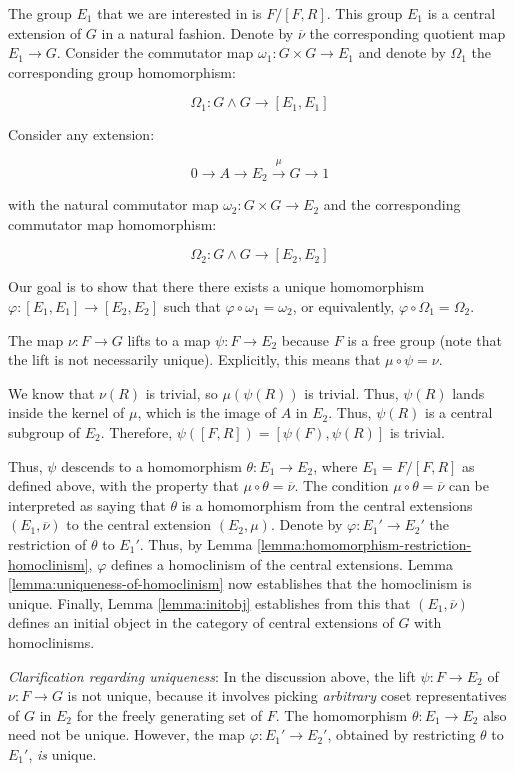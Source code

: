 \documentclass{ucetd}
\begin{document}
The group $E_1$ that we are interested in is $F/[F,R]$. This group
$E_1$ is a central extension of $G$ in a natural fashion. Denote by
$\overline{\nu}$ the corresponding quotient map $E_1 \to G$. Consider
the commutator map $\omega_1:G \times G \to E_1$ and denote by
$\Omega_1$ the corresponding group homomorphism:

$$\Omega_1: G \wedge G \to [E_1,E_1]$$

Consider any extension:

$$0 \to A \to E_2 \stackrel{\mu}{\to} G \to 1$$

with the natural commutator map $\omega_2:G \times G \to E_2$ and the
corresponding commutator map homomorphism:

$$\Omega_2:G \wedge G \to [E_2,E_2]$$

Our goal is to show that there there exists a unique homomorphism
$\varphi:[E_1,E_1] \to [E_2,E_2]$ such that $\varphi \circ
\omega_1 = \omega_2$, or equivalently, $\varphi \circ \Omega_1 =
\Omega_2$.

The map $\nu:F \to G$ lifts to a map $\psi:F \to E_2$ because
$F$ is a free group (note that the lift is not necessarily
unique). Explicitly, this means that $\mu \circ \psi = \nu$.

We know that $\nu(R)$ is trivial, so $\mu(\psi(R))$ is trivial. Thus,
$\psi(R)$ lands inside the kernel of $\mu$, which is the image of $A$
in $E_2$. Thus, $\psi(R)$ is a central subgroup of $E_2$. Therefore,
$\psi([F,R]) = [\psi(F),\psi(R)]$ is trivial.

Thus, $\psi$ descends to a homomorphism $\theta:E_1 \to E_2$, where
$E_1 = F/[F,R]$ as defined above, with the property that $\mu \circ
\theta = \overline{\nu}$. The condition $\mu \circ \theta =
\overline{\nu}$ can be interpreted as saying that $\theta$ is a
homomorphism from the central extensions $(E_1,\overline{\nu})$ to the
central extension $(E_2,\mu)$. Denote by $\varphi:E_1' \to E_2'$ the
restriction of $\theta$ to $E_1'$. Thus, by Lemma
\ref{lemma:homomorphism-restriction-homoclinism}, $\varphi$ defines a
homoclinism of the central extensions. Lemma
\ref{lemma:uniqueness-of-homoclinism} now establishes that the
homoclinism is unique. Finally, Lemma \ref{lemma:initobj} establishes
from this that $(E_1,\overline{\nu})$ defines an initial object in the
category of central extensions of $G$ with homoclinisms.

{\em Clarification regarding uniqueness}: In the discussion above, the
lift $\psi: F \to E_2$ of $\nu:F \to G$ is not unique, because it
involves picking {\em arbitrary} coset representatives of $G$ in $E_2$
for the freely generating set of $F$. The homomorphism $\theta:E_1 \to
E_2$ also need not be unique. However, the map $\varphi:E_1' \to
E_2'$, obtained by restricting $\theta$ to $E_1'$, {\em is} unique.
\end{document}
